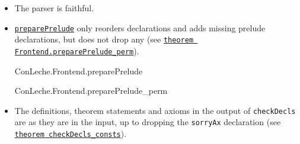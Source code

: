 \documentclass{article}
\newcommand\code[1]{\texttt{#1}}
\begin{document}
\begin{itemize}
\item The parser is faithful.
\item \href{https://github.com/leanprover/con-leche/blob/master/ConLeche/Frontend/Prepare.lean#L165-L172}{\code{preparePrelude}} only reorders declarations and adds missing prelude declarations, but does not drop any (see \href{https://github.com/leanprover/con-leche/blob/master/ConLeche/Verify/Frontend/Prepare.lean#L157-L162}{\code{theorem Frontend.preparePrelude\_perm}}).

\begin{leanblock}[view=lean, sum=oN41eIlo0i]{ConLeche.Frontend.preparePrelude}{}
\end{leanblock}

\begin{leanblock}[view=lean, sum=3Tv7O4SdoJ]{ConLeche.Frontend.preparePrelude_perm}{}
\end{leanblock}

\item The definitions, theorem statements and axioms in the output of \code{checkDecls} are as they are in the input, up to dropping the \code{sorryAx} declaration (see \href{https://github.com/leanprover/con-leche/blob/master/ConLeche/Model/StreamConsts.lean#L237-L242}{\code{theorem checkDecls\_consts}}).


\end{itemize}
\end{document}
